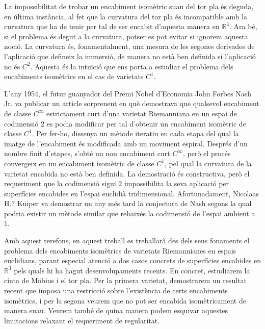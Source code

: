 La impossibilitat de trobar un encabiment isomètric suau del tor pla és deguda, en última instància, al fet que la curvatura del tor pla és incompatible amb la curvatura que ha de tenir per tal de ser encabit d'aquesta manera en $\mathbb R^3$. Ara bé, si el problema és degut a la curvatura, potser es pot evitar si ignorem aquesta noció. La curvatura és, fonamentalment, una mesura de les segones derivades de l'aplicació que defineix la immersió, de manera no està ben definida si l'aplicació no és $C^2$. Aquesta és la intuïció que ens porta a estudiar el problema dels encabiments isomètrics en el cas de varietats $C^1$.

L'any 1954, el futur guanyador del Premi Nobel d'Economia John Forbes Nash Jr. va publicar un article sorprenent en què demostrava que qualsevol encabiment de classe $C^\infty$ estrictament curt d'una varietat Riemanniana en un espai de codimensió $2$ es podia modificar per tal d'obtenir un encabiment isomètric de classe $C^1$. Per fer-ho, dissenya un mètode iteratiu en cada etapa del qual la imatge de l'encabiment és modificada amb un moviment espiral. Després d'un nombre finit d'etapes, s'obté un nou encabiment curt $C^\infty$, però el procés convergeix en un encabiment isomètric de classe $C^1$, pel qual la curvatura de la varietat encabida no està ben definida. La demostració és constructiva, però el requeriment que la codimensió sigui $2$ impossibilita la seva aplicació per superfícies encabides en l'espai euclidià tridimensional. Afortunadament, Nicolaas {\color{blue} H.?} Kuiper va demostrar un any més tard la conjectura de Nash segons la qual podria existir un mètode similar que rebaixés la codimensió de l'espai ambient a $1$. 

Amb aquest rerefons, en aquest treball es treballarà des dels seus fonaments el problema dels encabiments isomètrics de varietats Riemannianes en espais euclidians, parant especial atenció a dos casos concrets de superfícies encabides en $\mathbb R^3$ pels quals hi ha hagut desenvolupaments recents. En concret, estudiarem la cinta de Möbius i el tor pla. Per la primera varietat, demostrarem un resultat recent que imposa una restricció sobre l'existència de certs encabiments isomètrics, i per la segona veurem que no pot ser encabida isomètricament de manera suau. Veurem també de quina manera podem esquivar aquestes limitacions relaxant el requeriment de regularitat.


